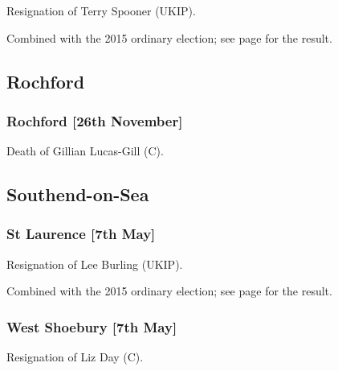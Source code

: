 \documentclass[a4paper,openany]{book}
\begin{document}
\begin{resultsiii}

Resignation of Terry Spooner (UKIP).

Combined with the 2015 ordinary election; see page \pageref{GreatParndonHarlow} for the result.

\subsection*{Rochford}

\subsubsection*{Rochford \hspace*{\fill}\nolinebreak[1]%
\enspace\hspace*{\fill}
[26th November]}


Death of Gillian Lucas-Gill (C).

\subsection*{Southend-on-Sea}

\subsubsection*{St Laurence \hspace*{\fill}\nolinebreak[1]%
\enspace\hspace*{\fill}
[7th May]}


Resignation of Lee Burling (UKIP).

Combined with the 2015 ordinary election; see page \pageref{StLaurenceSouthendonSea} for the result.

\subsubsection*{West Shoebury \hspace*{\fill}\nolinebreak[1]%
\enspace\hspace*{\fill}
[7th May]}


Resignation of Liz Day (C).


\end{resultsiii}
\end{document}
